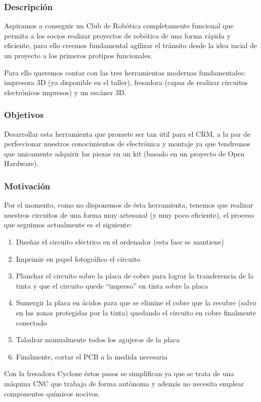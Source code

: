 \documentclass[12pt,twoside]{report}
\begin{document}
\subsubsection{Descripción}
Aspiramos a conseguir un Club de Robótica completamente funcional que permita a los socios realizar proyectos de robótica de una forma rápida y eficiente, para ello creemos fundamental agilizar el tránsito desde la idea incial de un proyecto a los primeros protipos funcionales.

Para ello queremos contar con las tres herramientas modernas fundamentales: impresora 3D (ya disponible en el taller), fresadora (capaz de realizar circuitos electrónicos impresos) y un escáner 3D.

\subsubsection{Objetivos}
Desarrollar esta herramienta que promete ser tan útil para el CRM, a la par de perfeccionar nuestros conocimientos de electrónica y montaje ya que tendremos que unicamente adquirir las piezas en un kit (basado en un proyecto de Open Hardware).

\subsubsection{Motivación}
Por el momento, como no disponemos de ésta herramienta, tenemos que realizar nuestros circuitos de una forma muy artesanal (y muy poco eficiente), el proceso que seguimos actualmente es el siguiente:
\begin{enumerate}
\item Diseñar el circuito eléctrico en el ordenador (esta fase se mantiene)
\item Imprimir en papel fotográfico el circuito
\item Planchar el circuito sobre la placa de cobre para lograr la transferencia de la tinta y que el circuito quede ``impreso'' en tinta sobre la placa
\item Sumergir la placa en ácidos para que se elimine el cobre que la recubre (salvo en las zonas protegidas por la tinta) quedando el circuito en cobre finalmente conectado
\item Taladrar manualmente todos los agujeros de la placa
\item Finalmente, cortar el PCB a la medida necesaria
\end{enumerate}

Con la fresadora Cyclone éstos pasos se simplifican ya que se trata de una máquina CNC que trabaja de forma autónoma y además no necesita emplear componentes químicos nocivos.
\end{document}

